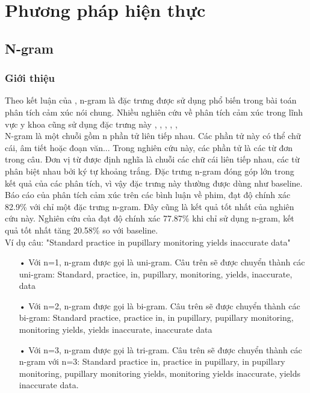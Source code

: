 \section{Phương pháp hiện thực}
\subsection{N-gram}
\subsubsection*{Giới thiệu}
Theo kết luận của \cite{chandrakala2012opinion}, n-gram là đặc trưng được sử dụng phổ biến trong bài toán phân tích cảm xúc nói chung. Nhiều nghiên cứu về phân tích cảm xúc trong lĩnh vực y khoa cũng sử dụng đặc trưng này \cite{pang2002thumbs}, \cite{niu2005analysis}, \cite{sarker2011outcome}, \cite{niu2006using}, \cite{pestian2012sentie}, \cite{xia09improving} \\

N-gram là một chuỗi gồm n phần tử liên tiếp nhau. Các phần tử này có thể chữ cái, âm tiết hoặc đoạn văn... Trong nghiên cứu này, các phần tử là các từ đơn trong câu. Đơn vị từ được định nghĩa là chuỗi các chữ cái liên tiếp nhau, các từ phân biệt nhau bởi ký tự khoảng trắng. Đặc trưng n-gram đóng góp lớn trong kết quả của các phân tích, vì vậy đặc trưng này thường được dùng như baseline. Báo cáo  của \cite{pang2002thumbs} phân tích cảm xúc trên các bình luận về phim, đạt độ chính xác 82.9\% với chỉ một đặc trưng n-gram. Đây cũng là kết quả tốt nhất của nghiên cứu này. Nghiên cứu của \cite{niu2005analysis} đạt độ chính xác 77.87\% khi chỉ sử dụng n-gram, kết quả tốt nhất tăng 20.58\% so với baseline. \\

Ví dụ câu: "Standard practice in pupillary monitoring yields inaccurate data"
\begin{itemize}
\item[•]Với n=1, n-gram được gọi là uni-gram. Câu trên sẽ được chuyển thành các uni-gram: Standard, practice, in, pupillary, monitoring, yields, inaccurate, data
\item[•]Với n=2, n-gram được gọi là bi-gram. Câu trên sẽ được chuyển thành các bi-gram: Standard practice, practice in, in pupillary, pupillary monitoring, monitoring yields, yields inaccurate, inaccurate data
\item[•]Với n=3, n-gram được gọi là tri-gram. Câu trên sẽ được chuyển thành các n-gram với n=3: Standard practice in, practice in pupillary, in pupillary monitoring, pupillary monitoring yields, monitoring yields inaccurate, yields inaccurate data.
\end{itemize}



